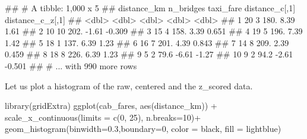 \documentclass[
]{book}
\newenvironment{Shaded}{\begin{snugshade}}{\end{snugshade}}
\newcommand{\AttributeTok}[1]{\textcolor[rgb]{0.77,0.63,0.00}{#1}}
\newcommand{\DecValTok}[1]{\textcolor[rgb]{0.00,0.00,0.81}{#1}}
\newcommand{\FloatTok}[1]{\textcolor[rgb]{0.00,0.00,0.81}{#1}}
\newcommand{\FunctionTok}[1]{\textcolor[rgb]{0.00,0.00,0.00}{#1}}
\newcommand{\NormalTok}[1]{#1}
\newcommand{\SpecialCharTok}[1]{\textcolor[rgb]{0.00,0.00,0.00}{#1}}
\newcommand{\StringTok}[1]{\textcolor[rgb]{0.31,0.60,0.02}{#1}}
\begin{document}
\begin{Shaded}
\begin{Highlighting}[]
\NormalTok{\#\# \# A tibble: 1,000 x 5}
\NormalTok{\#\#    distance\_km n\_bridges taxi\_fare distance\_c[,1] distance\_c\_z[,1]}
\NormalTok{\#\#          \textless{}dbl\textgreater{}     \textless{}dbl\textgreater{}     \textless{}dbl\textgreater{}          \textless{}dbl\textgreater{}            \textless{}dbl\textgreater{}}
\NormalTok{\#\#  1          20         3     180.            8.39            1.61 }
\NormalTok{\#\#  2          10        10     202.           {-}1.61           {-}0.309}
\NormalTok{\#\#  3          15         4     158.            3.39            0.651}
\NormalTok{\#\#  4          19         5     196.            7.39            1.42 }
\NormalTok{\#\#  5          18         1     137.            6.39            1.23 }
\NormalTok{\#\#  6          16         7     201.            4.39            0.843}
\NormalTok{\#\#  7          14         8     209.            2.39            0.459}
\NormalTok{\#\#  8          18         8     226.            6.39            1.23 }
\NormalTok{\#\#  9           5         2      79.6          {-}6.61           {-}1.27 }
\NormalTok{\#\# 10           9         2      94.2          {-}2.61           {-}0.501}
\NormalTok{\#\# \# ... with 990 more rows}
\end{Highlighting}
\end{Shaded}

Let us plot a histogram of the raw, centered and the z\_scored data.

\begin{Shaded}
\begin{Highlighting}[]
\FunctionTok{library}\NormalTok{(gridExtra)}
\FunctionTok{ggplot}\NormalTok{(cab\_fares, }\FunctionTok{aes}\NormalTok{(distance\_km)) }\SpecialCharTok{+}
        \FunctionTok{scale\_x\_continuous}\NormalTok{(}\AttributeTok{limits =} \FunctionTok{c}\NormalTok{(}\DecValTok{0}\NormalTok{, }\DecValTok{25}\NormalTok{), }\AttributeTok{n.breaks=}\DecValTok{10}\NormalTok{)}\SpecialCharTok{+}
        \FunctionTok{geom\_histogram}\NormalTok{(}\AttributeTok{binwidth=}\FloatTok{0.3}\NormalTok{,}\AttributeTok{boundary=}\DecValTok{0}\NormalTok{,}
                       \AttributeTok{color =} \StringTok{\textquotesingle{}black\textquotesingle{}}\NormalTok{,}
                       \AttributeTok{fill =} \StringTok{\textquotesingle{}lightblue\textquotesingle{}}\NormalTok{)}
\end{Highlighting}
\end{Shaded}
\end{document}
